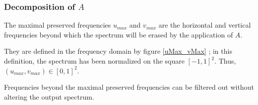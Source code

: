 	\subsubsection{Decomposition of $A$}
		\label{szeliski_decompositionDeA_section}
		\label{szeliski_frequencesMax_section}
		
		\begin{Def}
		\label{szeliski_def_maximal_preserved_frequencies}
		The maximal preserved frequencies $u_{max}$ and $v_{max}$ are the horizontal and vertical frequencies beyond which the spectrum will be erased by the application of $A$.
		
		They are defined in the frequency domain by figure \ref{uMax_vMax} ; in this definition, the spectrum has been normalized on the square $[-1,1]^2$. Thus, $(u_{max},v_{max})\in [0,1]^2$.
		\end{Def}
		
		Frequencies beyond the maximal preserved frequencies can be filtered out without altering the output spectrum. 
		
		
